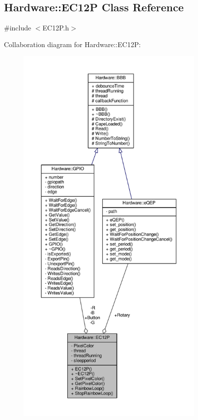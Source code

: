 \hypertarget{class_hardware_1_1_e_c12_p}{}\subsection{Hardware\+:\+:E\+C12\+P Class Reference}
\label{class_hardware_1_1_e_c12_p}


{\ttfamily \#include $<$E\+C12\+P.\+h$>$}



Collaboration diagram for Hardware\+:\+:E\+C12\+P\+:
\nopagebreak
\begin{figure}[H]
\begin{center}
\leavevmode
\includegraphics[height=550pt]{class_hardware_1_1_e_c12_p__coll__graph}
\end{center}
\end{figure}
